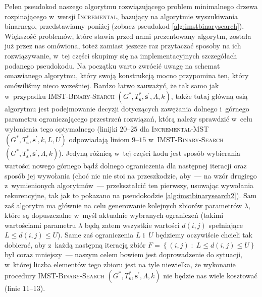 Pełen pseudokod naszego algorytmu rozwiązującego problem minimalnego drzewa rozpinającego w~wersji \textsc{Incremental}, bazujący na algorytmie wyszukiwania binarnego, przedstawiamy poniżej (zobacz pseudokod \ref{alg:imstbinarysearch}).
Większość problemów, które stawia przed nami prezentowany algorytm, została już przez nas omówiona, toteż zamiast jeszcze raz przytaczać sposoby na ich rozwiązywanie, w~tej części skupimy się na implementacyjnych szczegółach podanego pseudokodu.
Na początku warto zwrócić uwagę na schemat omawianego algorytmu, który swoją konstrukcją mocno przypomina ten, który omówiliśmy nieco wcześniej.
Bardzo łatwo zauważyć, że tak samo jak w~przypadku \textsc{IMST-Binary-Search} $\left( G^{\ast}, T^{\ast}_{\textbf{s}}, \textbf{s}^{\prime}, \Lambda, k \right)$, także tutaj główną osią algorytmu jest podejmowanie decyzji dotyczących zawężania dolnego i~górnego parametru ograniczającego przestrzeń rozwiązań, którą należy sprawdzić w~celu wyłonienia tego optymalnego (linijki $20$--$25$ dla \textsc{Incremental-MST} $\left( G^{\ast}, T^{\ast}_{\textbf{s}}, \textbf{s}^{\prime}, k, L, U \right)$ odpowiadają liniom $9$--$15$ w~\textsc{IMST-Binary-Search} $\left( G^{\ast}, T^{\ast}_{\textbf{s}}, \textbf{s}^{\prime}, \Lambda, k \right)$).
Jedyną różnicą w~tej części kodu jest sposób wybierania wartości nowego górnego bądź dolnego ograniczenia dla następnej iteracji oraz sposób jej wywołania (choć nic nie stoi na przeszkodzie, aby~--- na wzór drugiego z~wymienionych algorytmów~--- przekształcić ten pierwszy, usuwając wywołania rekurencyjne, tak jak to pokazano na pseudokodzie \ref{alg:imstbinarysearch2}).
Sam zaś algorytm ma głównie na celu generowanie kolejnych zbiorów parametrów $\lambda$, które są dopuszczalne w~myśl aktualnie wybranych ograniczeń (takimi wartościami parametru $\lambda$ będą zatem wszystkie wartości $d \left( i, j \right)$ spełniające $L \leqslant d \left( i, j \right) \leqslant U$).
Same zaś ograniczenia $L$ i~$U$ będziemy oczywiście chcieli tak dobierać, aby z~każdą następną iteracją zbiór $F = \left\{ \left( i, j \right) \; : \; L \leqslant d \left( i, j \right) \leqslant U \right\}$ był coraz mniejszy~--- naszym celem bowiem jest doprowadzenie do sytuacji, w~której liczba elementów tego zbioru jest na tyle niewielka, że wykonanie procedury \textsc{IMST-Binary-Search} $\left( G^{\ast}, T^{\ast}_{\textbf{s}}, \textbf{s}^{\prime}, \Lambda, k \right)$ nie będzie nas wiele kosztować (linie $11$--$13$). 

